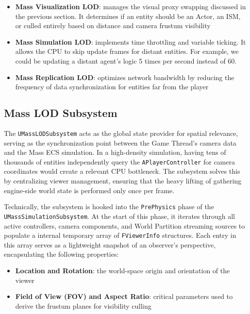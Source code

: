 \begin{itemize}
    \item \textbf{Mass Visualization LOD}: manages the visual proxy swapping discussed in the previous section. It determines if an entity should be an Actor, an ISM, or culled entirely based on distance and camera frustum visibility
    \item \textbf{Mass Simulation LOD}: implements time throttling and variable ticking. It allows the CPU to skip update frames for distant entities. For example, we could be updating a distant agent’s logic 5 times per second instead of 60.
    \item \textbf{Mass Replication LOD}: optimizes network bandwidth by reducing the frequency of data synchronization for entities far from the player
\end{itemize}

\subsection{Mass LOD Subsystem}

The \texttt{UMassLODSubsystem} acts as the global state provider for spatial relevance, serving as the synchronization point between the Game Thread's camera data and the Mass ECS simulation. In a high-density simulation, having tens of thousands of entities independently query the \texttt{APlayerController} for camera coordinates would create a relevant CPU bottleneck. The subsystem solves this by centralizing viewer management, ensuring that the heavy lifting of gathering engine-side world state is performed only once per frame.

Technically, the subsystem is hooked into the \texttt{PrePhysics} phase of the \newline\texttt{UMassSimulationSubsystem}. At the start of this phase, it iterates through all active controllers, camera components, and World Partition streaming sources to populate a internal temporary array of \texttt{FViewerInfo} structures. Each entry in this array serves as a lightweight snapshot of an observer's perspective, encapsulating the following properties: 

\begin{itemize}
    \item \textbf{Location and Rotation}: the world-space origin and orientation of the viewer
    \item \textbf{Field of View (FOV) and Aspect Ratio}: critical parameters used to derive the frustum planes for visibility culling
\end{itemize}

